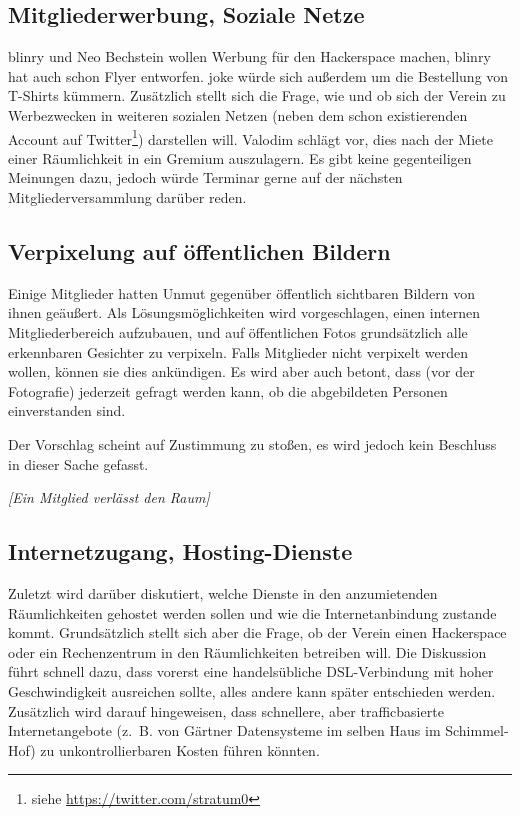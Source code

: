 \documentclass[a4paper,12pt]{scrartcl}
\begin{document}
\subsection{Mitgliederwerbung, Soziale Netze}
\postponed
blinry und Neo Bechstein wollen Werbung für den Hackerspace machen, blinry hat
auch schon Flyer entworfen. joke würde sich außerdem um die Bestellung von
T-Shirts kümmern. Zusätzlich stellt sich die Frage, wie und ob sich der Verein
zu Werbezwecken in weiteren sozialen Netzen (neben dem schon existierenden
Account auf Twitter\footnote{siehe \url{https://twitter.com/stratum0}})
darstellen will. Valodim schlägt vor, dies nach der Miete einer Räumlichkeit in
ein Gremium auszulagern. Es gibt keine gegenteiligen Meinungen dazu, jedoch
würde Terminar gerne auf der nächsten Mitgliederversammlung darüber reden.

\subsection{Verpixelung auf öffentlichen Bildern}
\novote
Einige Mitglieder hatten Unmut gegenüber öffentlich sichtbaren Bildern von
ihnen geäußert. Als Lösungsmöglichkeiten wird vorgeschlagen, einen internen
Mitgliederbereich aufzubauen, und auf öffentlichen Fotos grundsätzlich alle
erkennbaren Gesichter zu verpixeln. Falls Mitglieder nicht verpixelt werden
wollen, können sie dies ankündigen. Es wird aber auch betont, dass (vor der
Fotografie) jederzeit gefragt werden kann, ob die abgebildeten Personen
einverstanden sind.

Der Vorschlag scheint auf Zustimmung zu stoßen, es wird jedoch kein Beschluss in
dieser Sache gefasst.

\emph{[Ein Mitglied verlässt den Raum]}

\subsection{Internetzugang, Hosting-Dienste}
Zuletzt wird darüber diskutiert, welche Dienste in den anzumietenden
Räumlichkeiten gehostet werden sollen und wie die Internetanbindung zustande
kommt. Grundsätzlich stellt sich aber die Frage, ob der Verein einen Hackerspace
oder ein Rechenzentrum in den Räumlichkeiten betreiben will. Die Diskussion
führt schnell dazu, dass vorerst eine handelsübliche DSL-Verbindung mit
hoher Geschwindigkeit ausreichen sollte, alles andere kann später entschieden
werden. Zusätzlich wird darauf hingeweisen, dass schnellere, aber
trafficbasierte Internetangebote (z.~B. von Gärtner Datensysteme im selben Haus
im Schimmel-Hof) zu unkontrollierbaren Kosten führen könnten.
\end{document}
